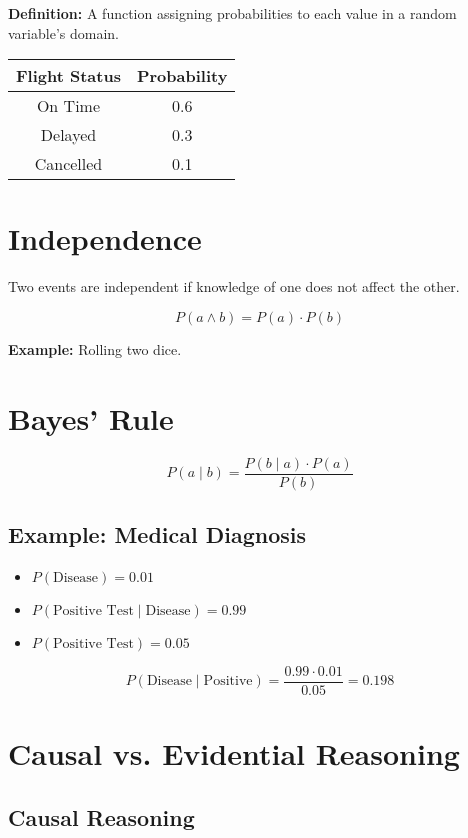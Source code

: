 \textbf{Definition:} A function assigning probabilities to each value in a random variable’s domain.

\begin{center}
\begin{tabular}{|c|c|}
\hline
\textbf{Flight Status} & \textbf{Probability} \\
\hline
On Time & 0.6 \\
Delayed & 0.3 \\
Cancelled & 0.1 \\
\hline
\end{tabular}
\end{center}

\section{Independence}

Two events are independent if knowledge of one does not affect the other.

\[
P(a \wedge b) = P(a) \cdot P(b)
\]

\textbf{Example:} Rolling two dice.

\section{Bayes’ Rule}

\[
P(a \mid b) = \frac{P(b \mid a) \cdot P(a)}{P(b)}
\]

\subsection*{Example: Medical Diagnosis}
\begin{itemize}
    \item \( P(\text{Disease}) = 0.01 \)
    \item \( P(\text{Positive Test} \mid \text{Disease}) = 0.99 \)
    \item \( P(\text{Positive Test}) = 0.05 \)
\end{itemize}

\[
P(\text{Disease} \mid \text{Positive}) = \frac{0.99 \cdot 0.01}{0.05} = 0.198
\]

\section{Causal vs. Evidential Reasoning}

\subsection*{Causal Reasoning}


